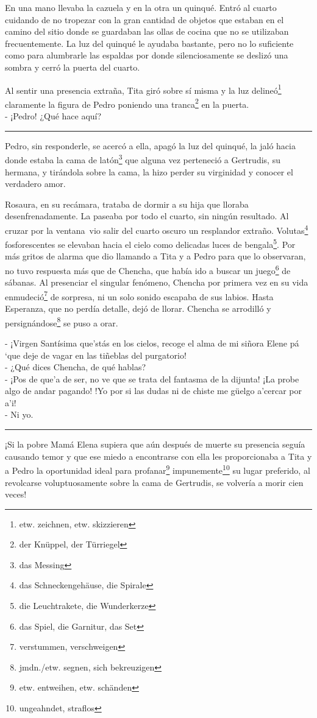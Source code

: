 En una mano llevaba la cazuela y en la otra un quinqué. Entró al cuarto
cuidando de no tropezar con la gran cantidad de objetos que estaban en
el camino del sitio donde se guardaban las ollas de cocina que no se
utilizaban frecuentemente. La luz del quinqué le ayudaba bastante, pero
no lo suficiente como para alumbrarle las espaldas por donde
silenciosamente se deslizó una sombra y cerró la puerta del cuarto.

Al sentir una presencia extraña, Tita giró sobre sí misma y la luz delineó\footnote{etw. zeichnen, etw. skizzieren} claramente
la figura de Pedro poniendo una tranca\footnote{der Knüppel, der Türriegel}
en la puerta.
\\- ¡Pedro! ¿Qué hace aquí? \\
\rule{1em}{0pt}Pedro, sin responderle, se acercó a ella, apagó la luz del quinqué, la
jaló hacia donde estaba la cama de latón\footnote{das Messing} que
alguna vez perteneció a Gertrudis, su hermana, y tirándola sobre la cama,
la hizo perder su virginidad y conocer el verdadero amor.

Rosaura, en su recámara, trataba de dormir a su hija que lloraba
desenfrenadamente. La paseaba por todo el cuarto, sin ningún resultado.
Al cruzar por la ventana~vio salir del cuarto oscuro un resplandor
extraño. Volutas\footnote{das Schneckengehäuse, die Spirale}
fosforescentes se elevaban hacia el cielo como
delicadas luces de bengala\footnote{die Leuchtrakete, die Wunderkerze}.
Por más gritos de alarma que dio llamando a Tita y a Pedro para que lo observaran,
no tuvo respuesta más que de Chencha, que había ido a buscar un juego\footnote{das Spiel, die Garnitur, das Set}
de sábanas. Al presenciar el singular fenómeno, Chencha por primera vez en
su vida enmudeció\footnote{verstummen, verschweigen} de
sorpresa, ni un solo sonido escapaba de sus labios. Hasta Esperanza, que
no perdía detalle, dejó de llorar. Chencha se arrodilló y persignándose\footnote{jmdn./etw. segnen, sich bekreuzigen}
se puso a orar.

- ¡Virgen Santísima que’stás en los cielos, recoge el alma de mi siñora %
Elene pá ‘que deje de vagar en las tiñeblas del purgatorio! %
\\- ¿Qué dices Chencha, de qué hablas? %
\\- ¡Pos de que’a de ser, no ve que se trata del fantasma de la dijunta! %
¡La probe algo de andar pagando! !Yo por si las dudas ni de chiste me %
güelgo a’cercar por a’i! %
\\- Ni yo. \\
\rule{1em}{0pt}¡Si la pobre Mamá Elena supiera que aún después de muerte su presencia
seguía causando temor y que ese miedo a encontrarse con ella les
proporcionaba a Tita y a Pedro la oportunidad ideal para profanar\footnote{etw. entweihen, etw. schänden} impunemente\footnote{ungeahndet, straflos} su lugar preferido,
al revolcarse voluptuosamente sobre la cama de Gertrudis, se volvería a
morir cien veces!

